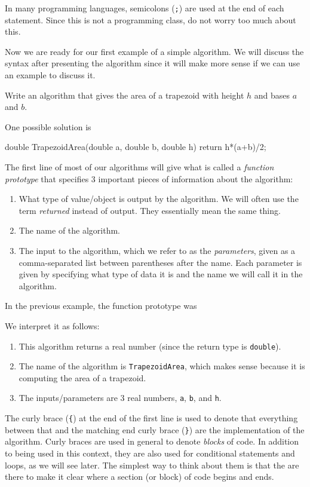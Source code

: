 \begin{rem}
In many programming languages, semicolons (\verb+;+) 
are used at the end of each statement. Since this is not a
programming class, do not worry too much about this.
\end{rem}

Now we are ready for our first example of a simple algorithm. 
We will discuss the syntax after presenting the algorithm 
since it will make more sense if
we can use an example to discuss it.

\begin{exa}\label{exa:areaTrap}
Write an algorithm that gives the area of a trapezoid with height
$h$ and bases $a$ and $b$.  
\begin{sol}
One possible solution is
\begin{code}
double TrapezoidArea(double a, double b, double h) {
    return h*(a+b)/2;
}
\end{code}
\end{sol}
\end{exa}

The first line of most of our algorithms will give what is called
a {\em function prototype} that specifies 3 important pieces
of information about the algorithm:
\begin{enumerate}
\item What type of value/object is output by the algorithm.
We will often use the term {\em returned} instead
of output. They essentially mean the same thing.
\item The name of the algorithm.
\item The input to the algorithm, which we refer to as the 
{\em parameters}, given as a comma-separated list 
between parentheses after the name. 
Each parameter is given by specifying what type of
data it is and the name we will call it in the algorithm.
\end{enumerate}
In the previous example, the function prototype was
\begin{code}
    double TrapezoidArea(double a, double b, double h) {
\end{code}
We interpret it as follows:
\begin{enumerate}
\item
This algorithm returns a real number (since the return type
is \verb+double+). 
\item The name of the algorithm is \verb+TrapezoidArea+, which
makes sense because it is computing the area of a trapezoid.
\item
The inputs/parameters are 3 real numbers, \verb+a+,
\verb+b+, and \verb+h+.
\end{enumerate}
The curly brace (\verb+{+) at the end of the first line is used to denote that everything between that and the matching
end curly brace (\verb+}+) are the implementation of the algorithm.
Curly braces are used in general to denote
{\em blocks} of code. In addition to being used in this context,
they are also used for conditional statements and loops,
as we will see later. The simplest way to think about them is that
the are there to make it clear where a section (or block) of code
begins and ends.

